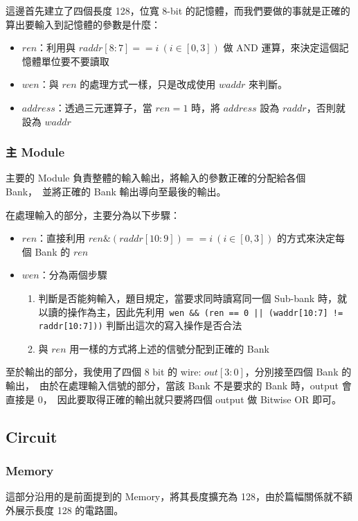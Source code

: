\documentclass[10.5pt,compsoc,UTF8]{CjC}
\theoremstyle{mystyle}
\begin{document}
這邊首先建立了四個長度 128，位寬 8-bit 的記憶體，而我們要做的事就是正確的算出要輸入到記憶體的參數是什麼：
\begin{itemize}
  \item $ren$：利用與 $raddr[8:7] == i\ (i \in [0, 3])$ 做 AND 運算，來決定這個記憶體單位要不要讀取
  \item $wen$：與 $ren$ 的處理方式一樣，只是改成使用 $waddr$ 來判斷。
  \item $address$：透過三元運算子，當 $ren = 1$ 時，將 $address$ 設為 $raddr$，否則就設為 $waddr$
\end{itemize}



\subsubsection*{主 Module}

主要的 Module 負責整體的輸入輸出，將輸入的參數正確的分配給各個 Bank，\
並將正確的 Bank 輸出導向至最後的輸出。

在處理輸入的部分，主要分為以下步驟：
\begin{itemize}
  \item $ren$：直接利用 $ren \& (raddr[10:9]) == i\ (i \in [0, 3])$ 的方式來決定每個 Bank 的 $ren$
  \item $wen$：分為兩個步驟
  \begin{enumerate}
    \item 判斷是否能夠輸入，題目規定，當要求同時讀寫同一個 Sub-bank 時，就以讀的操作為主，因此先利用\
    \texttt{wen \&\& (ren == 0 || (waddr[10:7] != raddr[10:7]))} 判斷出這次的寫入操作是否合法
    \item 與 $ren$ 用一樣的方式將上述的信號分配到正確的 Bank
  \end{enumerate}
\end{itemize}

至於輸出的部分，我使用了四個 8 bit 的 wire: $out[3:0]$，分別接至四個 Bank 的輸出，\
由於在處理輸入信號的部分，當該 Bank 不是要求的 Bank 時，output 會直接是 $0$，\
因此要取得正確的輸出就只要將四個 output 做 Bitwise OR 即可。


\subsection{Circuit}

\subsubsection*{Memory}
這部分沿用的是前面提到的 Memory，將其長度擴充為 128，由於篇幅關係就不額外展示長度 128 的電路圖。
\end{document}
